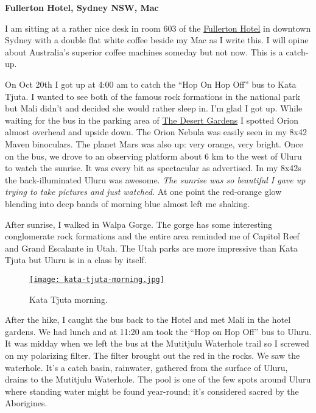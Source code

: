 \textbf{Fullerton Hotel, Sydney NSW, Mac}

I am sitting at a rather nice desk in room 603 of the
\href{https://www.fullertonhotels.com/fullerton-hotel-sydney}{Fullerton
Hotel} in downtown Sydney with a double flat white coffee beside my Mac
as I write this. I will opine about Australia's superior coffee machines
someday but not now. This is a catch-up.

On Oct 20th I got up at 4:00 am to catch the ``Hop On Hop Off'' bus to
Kata Tjuta. I wanted to see both of the famous rock formations in the
national park but Mali didn't and decided she would rather sleep in. I'm
glad I got up. While waiting for the bus in the parking area of
\href{https://www.ayersrockresort.com.au/accommodation/desert-gardens-hotel}{The
Desert Gardens} I spotted Orion almost overhead and upside down. The
Orion Nebula was easily seen in my 8x42 Maven binoculars. The planet
Mars was also up: very orange, very bright. Once on the bus, we drove to
an observing platform about 6 km to the west of Uluru to watch the
sunrise. It was every bit as spectacular as advertised. In my 8x42s the
back-illuminated Uluru was awesome. \emph{The sunrise was so beautiful I
gave up trying to take pictures and just watched.} At one point the
red-orange glow blending into deep bands of morning blue almost left me
shaking.

After sunrise, I walked in Walpa Gorge. The gorge has some interesting
conglomerate rock formations and the entire area reminded me of Capitol
Reef and Grand Escalante in Utah. The Utah parks are more impressive
than Kata Tjuta but Uluru is in a class by itself.

\captionsetup[figure]{labelformat=empty}
\begin{figure}[htbp]
\centering
\href{https://conceptcontrol.smugmug.com/Trips/Overseas/Australia-New-Zealand-2022/i-kSz8XH4/A}{\texttt{[image: kata-tjuta-morning.jpg]}}
\caption{Kata Tjuta morning.}
\label{fig:7573x3}
\end{figure}


After the hike, I caught the bus back to the Hotel and met Mali in the
hotel gardens. We had lunch and at 11:20 am took the ``Hop on Hop Off''
bus to Uluru. It was midday when we left the bus at the Mutitjulu
Waterhole trail so I screwed on my polarizing filter. The filter brought
out the red in the rocks. We saw the waterhole. It's a catch basin,
rainwater, gathered from the surface of Uluru, drains to the Mutitjulu
Waterhole. The pool is one of the few spots around Uluru where standing
water might be found year-round; it's considered sacred by the
Aborigines.

